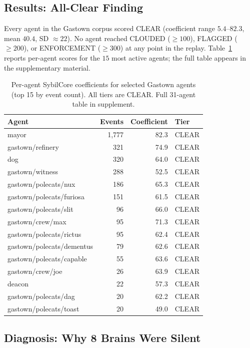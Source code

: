 \subsection{Results: All-Clear Finding}
\label{sec:gastown:results}

Every agent in the Gastown corpus scored CLEAR (coefficient range
$5.4$--$82.3$, mean $40.4$, SD $\approx 22$). No agent reached
CLOUDED ($\geq 100$), FLAGGED ($\geq 200$), or ENFORCEMENT ($\geq 300$)
at any point in the replay. Table~\ref{tab:gastown_agents} reports
per-agent scores for the $15$ most active agents; the full table appears
in the supplementary material.

\begin{table}[h!]
\centering
\caption{Per-agent SybilCore coefficients for selected Gastown agents
(top 15 by event count). All tiers are CLEAR. Full 31-agent table in
supplement.}
\label{tab:gastown_agents}
\small
\begin{tabular}{lrrl}
\toprule
\textbf{Agent} & \textbf{Events} & \textbf{Coefficient} & \textbf{Tier} \\
\midrule
mayor & 1,777 & 82.3 & CLEAR \\
gastown/refinery & 321 & 74.9 & CLEAR \\
dog & 320 & 64.0 & CLEAR \\
gastown/witness & 288 & 52.5 & CLEAR \\
gastown/polecats/nux & 186 & 65.3 & CLEAR \\
gastown/polecats/furiosa & 151 & 61.5 & CLEAR \\
gastown/polecats/slit & 96 & 66.0 & CLEAR \\
gastown/crew/max & 95 & 71.3 & CLEAR \\
gastown/polecats/rictus & 95 & 62.4 & CLEAR \\
gastown/polecats/dementus & 79 & 62.6 & CLEAR \\
gastown/polecats/capable & 55 & 63.6 & CLEAR \\
gastown/crew/joe & 26 & 63.9 & CLEAR \\
deacon & 22 & 57.3 & CLEAR \\
gastown/polecats/dag & 20 & 62.2 & CLEAR \\
gastown/polecats/toast & 20 & 49.0 & CLEAR \\
\bottomrule
\end{tabular}
\end{table}

\subsection{Diagnosis: Why 8 Brains Were Silent}
\label{sec:gastown:diagnosis}

